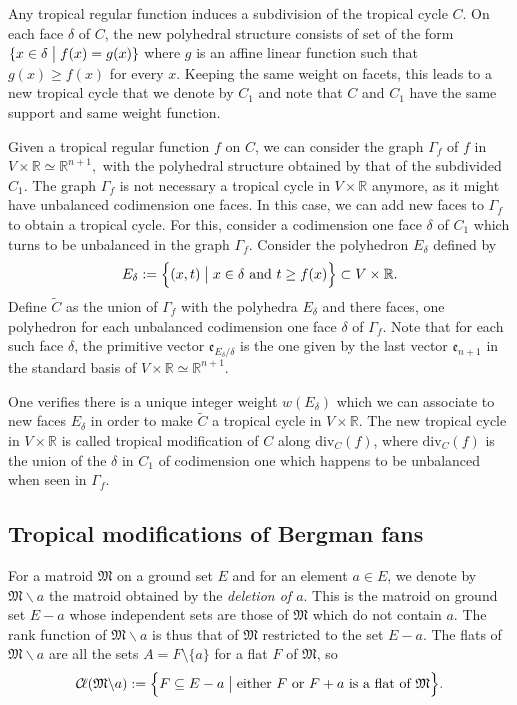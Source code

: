 \documentclass[11pt]{amsart}
\theoremstyle{definition}
\numberwithin{equation}{section}
\renewcommand{\~}{\widetilde}
\newcommand{\R}{\mathbb{R}}
\newcommand{\myand}{\text{ and }}
\newcommand{\Cl}{\mathcal C\!\ell} %
\newcommand{\e}{{\mathfrak e}} %
\renewcommand{\div}{\mathrm{div}} %
\newcommand{\st}{\bigm|} %
\newcommand{\Ma}{\mathfrak M} %
\newcommand{\del}{\backslash} %
\begin{document}
Any tropical regular function induces a subdivision of the tropical cycle $C$. On each face $\delta$ of $C$, the new polyhedral structure consists of set of the form $\{x\in\delta \st f(x) = g(x) \}$ where $g$ is an affine linear function such that $g(x)\geq f(x)$ for every $x$. Keeping the same weight on facets, this leads to a new tropical cycle that we denote by $C_1$ and note that $C$ and $C_1$ have the same support and same weight function.

Given a tropical regular function $f$ on $C$, we can consider the graph $\Gamma_f$ of $f$ in $V \times \R \simeq \R^{n+1},$ with the polyhedral structure obtained by that of the subdivided $C_1$. The graph $\Gamma_f$ is not necessary a tropical cycle in $V\times \R$ anymore, as it might have unbalanced codimension one faces. In this case, we can add new faces to $\Gamma_f$ to obtain a tropical cycle. For this, consider a codimension one face $\delta$ of $C_1$ which turns to be unbalanced in the graph $\Gamma_f$. Consider the  polyhedron $E_\delta$ defined by
\[E_\delta := \Bigl\{ (x, t) \st x \in \delta \myand t \geq f(x)\Bigr\} \subset V \times \R.\]
Define $\widetilde C$ as the union of $\Gamma_f$ with the polyhedra $E_\delta$ and there faces, one polyhedron for each unbalanced codimension one face $\delta$ of $\Gamma_f$.  Note that for each such face $\delta$, the primitive vector $\e_{E_\delta/\delta}$ is the one given by the last vector $\e_{n+1}$ in the standard basis of $V\times \R \simeq \R^{n+1}$.

One verifies there is a unique integer weight $w(E_\delta)$ which we can associate to new faces $E_\delta$ in order to make $\widetilde C$ a tropical cycle in $V\times \R$.  The new tropical cycle in $V\times \R$ is called tropical modification of $C$ along $\div_C(f)$, where $\div_C(f)$ is the union of the $\delta$ in $C_1$ of codimension one which happens to be unbalanced when seen in $\Gamma_f$.



\subsection{Tropical modifications of Bergman fans} \label{sec:modification}

For a matroid $\Ma$ on a ground set $E$ and for an element $a \in E$, we denote by $\Ma \del a$ the matroid obtained by the \emph{deletion of $a$}. This is the matroid on ground set $E - a$ whose independent sets are those of $\Ma$ which do not contain $a$. The rank function of $\Ma\del a$ is thus that of $\Ma$ restricted to the set $E-a$. The flats of $\Ma\del a$ are all the sets $A = F\setminus\{a\}$ for a flat $F$ of $\Ma$, so
\[\Cl(\Ma \del a) := \Bigl\{F \subseteq E - a \st \textrm{either $F$ or $F+a$ is a flat of $\Ma$} \Bigr\}.\]
\end{document}
